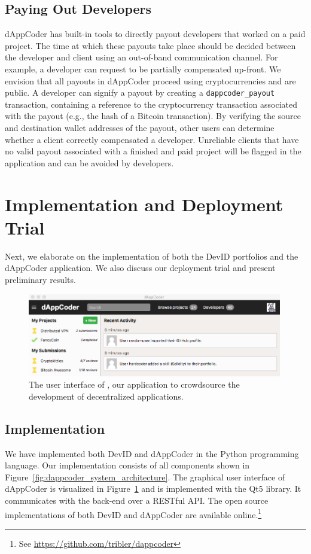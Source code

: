 \subsection{Paying Out Developers}
\label{subsec:dappcoder_payout}
dAppCoder has built-in tools to directly payout developers that worked on a paid project.
The time at which these payouts take place should be decided between the developer and client using an out-of-band communication channel.
For example, a developer can request to be partially compensated up-front.
We envision that all payouts in dAppCoder proceed using cryptocurrencies and are public.
A developer can signify a payout by creating a \texttt{dappcoder\_payout} transaction, containing a reference to the cryptocurrency transaction associated with the payout (e.g., the hash of a Bitcoin transaction).
By verifying the source and destination wallet addresses of the payout, other users can determine whether a client correctly compensated a developer.
Unreliable clients that have no valid payout associated with a finished and paid project will be flagged in the application and can be avoided by developers.

\section{Implementation and Deployment Trial}
\label{sec:experiments}
Next, we elaborate on the implementation of both the DevID portfolios and the dAppCoder application.
We also discuss our deployment trial and present preliminary results.

\begin{figure}[t!]
	\centering
	\includegraphics[width=0.99\textwidth]{devid/resources/gui_smaller.png}
	\caption{The user interface of \Dappcoder{}, our application to crowdsource the development of decentralized applications.}
	\label{fig:dappcoder}
\end{figure}

\subsection{Implementation}
We have implemented both DevID and dAppCoder in the Python programming language.
Our implementation consists of all components shown in Figure~\ref{fig:dappcoder_system_architecture}.
The graphical user interface of dAppCoder is visualized in Figure~\ref{fig:dappcoder} and is implemented with the Qt5 library.
It communicates with the back-end over a RESTful API.
The open source implementations of both DevID and dAppCoder are available online.\footnote{See \url{https://github.com/tribler/dappcoder}}

